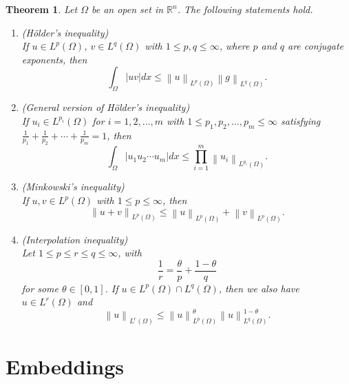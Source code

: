 \documentclass[11pt,a4paper]{report}
\newtheorem{theorem}{Theorem}[section]
\theoremstyle{definition}
\begin{document}
\begin{theorem}
	Let $\Omega$ be an open set in $\mathbb{R}^{n}$.
	The following statements hold.
	\begin{enumerate}[label=(\alph*)] 
		\rm\item (H\"{o}lder's inequality) \\[0.1cm]
		If $u \in L^p(\Omega)$, $v \in L^q(\Omega)$ with $1 \leq p, q \leq \infty$, where $p$ and $q$ are conjugate exponents, then 
		\begin{equation*} 
			\int_{\Omega} |uv|dx \leq \left\| u \right\|_{L^p(\Omega)} \left\| g \right\|_{L^q(\Omega)}.
		\end{equation*}
		\rm\item (General version of H\"{o}lder's inequality) \\[0.1cm]
		If $u_i \in L^{p_i}(\Omega)$ for $i = 1, 2, \ldots, m$ with $1 \leq p_1, p_2, \ldots, p_m \leq \infty$ satisfying $\frac{1}{p_1} + \frac{1}{p_2} + \cdots + \frac{1}{p_m} = 1$, then 
		\begin{equation*} 
			\int_{\Omega} |u_1 u_2 \cdots u_m |dx \leq \prod_{i=1}^m \left\| u_i \right\|_{L^{p_i}(\Omega)}.
		\end{equation*}
		\rm\item (Minkowski's inequality)\\[0.1cm]
		If $u, v \in L^p(\Omega)$ with $1 \leq p  \leq \infty$, then 
		\begin{equation*} 
			\left\| u + v\right\|_{L^p(\Omega)} \leq \left\| u \right\|_{L^p(\Omega)} + \left\| v \right\|_{L^p(\Omega)}.
		\end{equation*}
		\rm\item (Interpolation inequality)\\[0.1cm]
		Let $1 \leq p \leq r \leq q \leq \infty$, with 
		\begin{equation*} 
			\frac{1}{r} = \frac{\theta}{p} + \frac{1 - \theta}{q}
		\end{equation*}
		for some $\theta \in [0, 1]$.
		If $u \in L^p(\Omega) \cap L^q(\Omega)$, then we also have $u \in L^r(\Omega)$ and 
		\begin{equation*} 
			\left\| u \right\|_{L^r(\Omega)} \leq \left\| u \right\|^{\theta}_{L^p(\Omega)} \left\| u \right\|^{1 - \theta}_{L^q(\Omega)}.
		\end{equation*}
	\end{enumerate}
\end{theorem}


\chapter{Embeddings}
\end{document}
